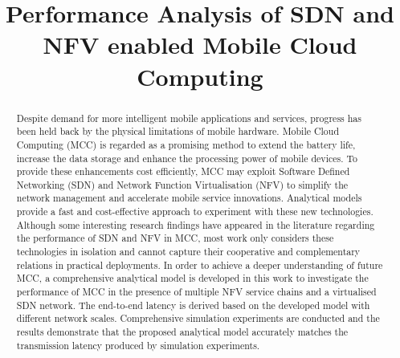 \documentclass[conference]{IEEEtran}
\begin{document}
\title{Performance Analysis of SDN and NFV enabled Mobile Cloud Computing}

\author{
}
 
\maketitle

\begin{abstract}
Despite demand for more intelligent mobile applications and services, progress has been held back by the physical limitations of mobile hardware. Mobile Cloud Computing (MCC) is regarded as a promising method to extend the battery life, increase the data storage and enhance the processing power of mobile devices. To provide these enhancements cost efficiently, MCC may exploit Software Defined Networking (SDN) and Network Function Virtualisation (NFV) to simplify the network management and accelerate mobile service innovations. Analytical models provide a fast and cost-effective approach to experiment with these new technologies. Although some interesting research findings have appeared in the literature regarding the performance of SDN and NFV in MCC, most work only considers these technologies in isolation and cannot capture their cooperative and complementary relations in practical deployments. In order to achieve a deeper understanding of future MCC, a comprehensive analytical model is developed in this work to investigate the performance of MCC in the presence of multiple NFV service chains and a virtualised SDN network. The end-to-end latency is derived based on the developed model with different network scales. Comprehensive simulation experiments are conducted and the results demonstrate that the proposed analytical model accurately matches the transmission latency produced by simulation experiments.
\end{abstract}










% 





\end{document}
